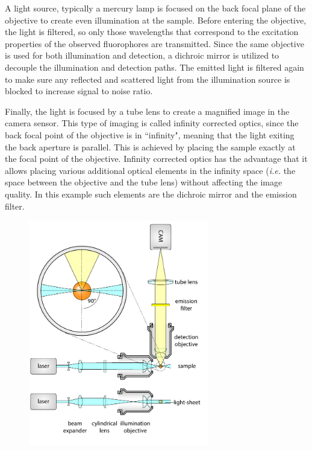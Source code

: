     A light source, typically a mercury lamp is focused on the back focal plane of the objective to create even illumination at the sample. Before entering the objective, the light is filtered, so only those wavelengths that correspond to the excitation properties of the observed fluorophores are transmitted. Since the same objective is used for both illumination and detection, a dichroic mirror is utilized to decouple the illumination and detection paths. The emitted light is filtered again to make sure any reflected and scattered light from the illumination source is blocked to increase signal to noise ratio.

    Finally, the light is focused by a tube lens to create a magnified image in the camera sensor. This type of imaging is called infinity corrected optics, since the back focal point of the objective is in ``infinity", meaning that the light exiting the back aperture is parallel. This is achieved by placing the sample exactly at the focal point of the objective. Infinity corrected optics has the advantage that it allows placing various additional optical elements in the infinity space (\textit{i.e.} the space between the objective and the tube lens) without affecting the image quality. In this example such elements are the dichroic mirror and the emission filter. 

    \begin{figure}[tb]
      \centering
      \includegraphics[page=4,width=0.7\textwidth]{spim_cyl}
      \label{fig:wide-field}
    \end{figure}


